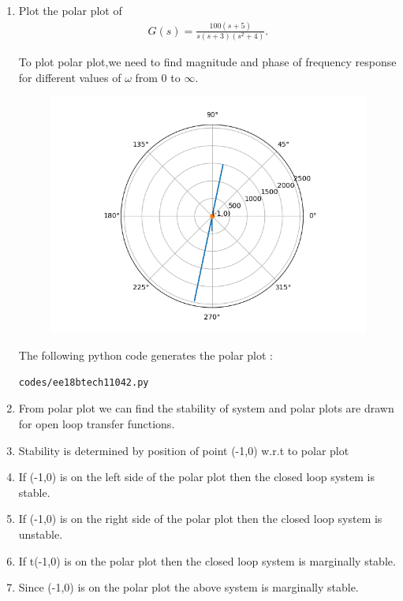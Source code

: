 \begin{enumerate}[label=\thesection.\arabic*.,ref=\thesection.\theenumi]
\item Plot the polar plot of 
\begin{align}
G(s) = \frac{100(s+5)}{s(s+3)(s^2+4)}. 
\end{align}

\solution
To plot polar plot,we need to find magnitude and phase of frequency response for different values of $\omega$ from  0 to   $\infty$.

\begin{figure}[!h]
  \includegraphics[width=\columnwidth]{ee18btech11042.png}
  \label{fig:polarplot}
\end{figure}

The following python code generates the polar plot : 
\begin{lstlisting}
codes/ee18btech11042.py
\end{lstlisting}
\item From polar plot we can find the stability of system and polar plots are drawn for open loop transfer functions.
\item
Stability is determined by position of point (-1,0) w.r.t to polar plot


\item If (-1,0)  is  on the left side  of the polar plot then the closed loop system is stable.
\item If (-1,0) is  on the right side of the polar plot then the closed loop system is unstable.
\item If t(-1,0) is on the polar plot then the closed loop system is marginally stable.
\item
Since (-1,0) is on the  polar plot the  above system is  marginally stable.

\end{enumerate}


